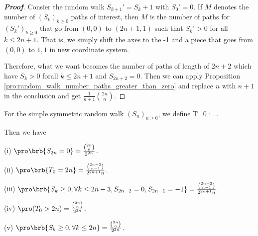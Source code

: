 \begin{proof}[\bf Proof]
Consier the random walk $S_{k+1}' = S_k+1$ with $S_0' = 0$. If $M$ denotes the number of $(S_k)_{k\geq 0}$ paths of interest, then $M$ is the number of paths for $(S_k')_{k\geq 0}$ that go from $(0,0)$ to $(2n+1,1)$ such that $S_k'>0$ for all $k\leq 2n+1$. That is, we simply shift the axes to the -1 and a piece that goes from $(0,0)$ to $1,1$ in new coordinate system.




Therefore, what we want becomes the number of paths of length of $2n+2$ which have $S_k >0$ forall $k\leq 2n+1$ and $S_{2n+2}=0$. Then we can apply Proposition \ref{pro:random_walk_number_paths_greater_than_zero} and replace $n$ with $n+1$ in the conclusion and get $\frac 1{n+1}\binom{2n}{n}$.
\end{proof}


\begin{proposition}
For the simple symmetric random walk $(S_n)_{n\geq 0}$, we define
\be
T_0 :=\inf{}.
\ee

Then we have
\ben
\item [(i)] $\pro\brb{S_{2n}=0} =  \frac{\binom{2n}{n}}{2^{2n}}$.
\item [(ii)] $\pro\brb{T_0 = 2n} = \frac{\binom{2n-2}{n-1}}{2^{2n+1}n}$.
\item [(iii)] $\pro\brb{S_k\geq 0,\forall k\leq 2n-3, S_{2n-2} =0, S_{2n-1}=-1} = \frac{\binom{2n-2}{n-1}}{2^{2n+1}n}$.
\item [(iv)] $\pro(T_0>2n) = \frac{\binom{2n}{n}}{2^{2n}}$.
\item [(v)] $\pro\brb{S_k\geq 0, \forall k\leq 2n} = \frac{\binom{2n}{n}}{2^{2n}}$.
\een
\end{proposition}

